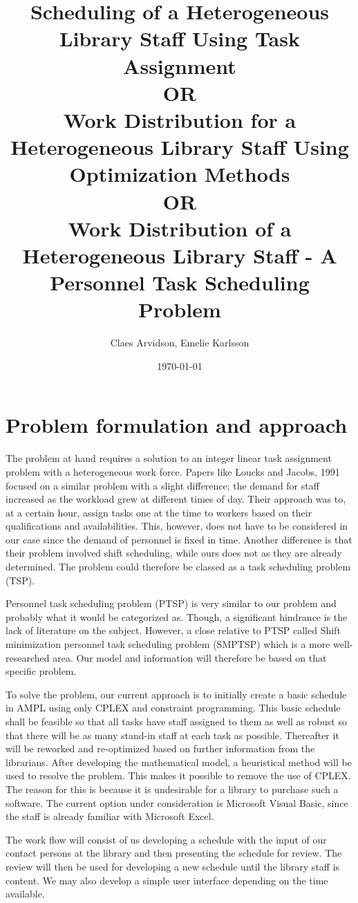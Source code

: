 \documentclass{article}
\title{Scheduling of a Heterogeneous Library Staff Using Task Assignment \\ OR \\
Work Distribution for a Heterogeneous Library Staff Using Optimization Methods \\ OR \\ Work Distribution of a Heterogeneous Library Staff - A Personnel Task Scheduling Problem}
\author{Claes Arvidson, Emelie Karlsson}
\date{\today}
\begin{document}
 
\maketitle
\pagebreak
 
\section*{Problem formulation and approach}
The problem at hand requires a solution to an integer linear task assignment problem with a heterogeneous work force. Papers like Loucks and Jacobs, 1991 focused on a similar problem with a slight difference; the demand for staff increased as the workload grew at different times of day. Their approach was to, at a certain hour, assign tasks one at the time to workers based on their qualifications and availabilities. This, however, does not have to be considered in our case since the demand of personnel is fixed in time. Another difference is that their problem involved shift scheduling, while ours does not as they are already determined. The problem could therefore be classed as a task scheduling problem (TSP).

Personnel task scheduling problem (PTSP) is very similar to our problem and probably what it would be categorized as. Though, a significant hindrance is the lack of literature on the subject. However, a close relative to PTSP called Shift minimization personnel task scheduling problem (SMPTSP) which is a more well-researched area. Our model and information will therefore be based on that specific problem.

To solve the problem, our current approach is to initially create a basic schedule in AMPL using only CPLEX and constraint programming. This basic schedule shall be feasible so that all tasks have staff assigned to them as well as robust so that there will be as many stand-in staff at each task as possible. Thereafter it will be reworked and re-optimized based on further information from the librarians. After developing the mathematical model, a heuristical method will be used to resolve the problem. This makes it possible to remove the use of CPLEX. The reason for this is because it is undesirable for a library to purchase such a software. The current option under consideration is Microsoft Visual Basic, since the staff is already familiar with Microsoft Excel.

The work flow will consist of us developing a schedule with the input of our contact persons at the library and then presenting the schedule for review. The review will then be used for developing a new schedule until the library staff is content. We may also develop a simple user interface depending on the time available.
\end{document}
